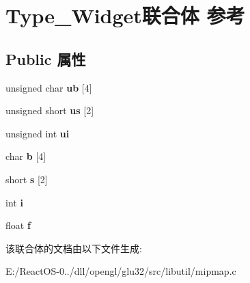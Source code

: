 \hypertarget{union_type___widget}{}\section{Type\+\_\+\+Widget联合体 参考}
\label{union_type___widget}
\subsection*{Public 属性}
\begin{DoxyCompactItemize}
\item 
\mbox{\label{union_type___widget_ac15a6da17ad8d17b7a9abad3d7ec841c}} 
unsigned char {\bfseries ub} \mbox{[}4\mbox{]}
\item 
\mbox{\label{union_type___widget_a069a26c11a649b6653533ec875b544ed}} 
unsigned short {\bfseries us} \mbox{[}2\mbox{]}
\item 
\mbox{\label{union_type___widget_ad0b57dd3500645e7abd236fe74e37028}} 
unsigned int {\bfseries ui}
\item 
\mbox{\label{union_type___widget_a8b996c25744d0cf59bc4ad12b2826690}} 
char {\bfseries b} \mbox{[}4\mbox{]}
\item 
\mbox{\label{union_type___widget_a43b9be0657ae2c06a52f2742570ada24}} 
short {\bfseries s} \mbox{[}2\mbox{]}
\item 
\mbox{\label{union_type___widget_a791a04a9f3be26abae912ea0762ead4e}} 
int {\bfseries i}
\item 
\mbox{\label{union_type___widget_ac5489814810c1353018fcf16585d0b86}} 
float {\bfseries f}
\end{DoxyCompactItemize}


该联合体的文档由以下文件生成\+:\begin{DoxyCompactItemize}
\item 
E\+:/\+React\+O\+S-\/0../dll/opengl/glu32/src/libutil/mipmap.\+c\end{DoxyCompactItemize}

